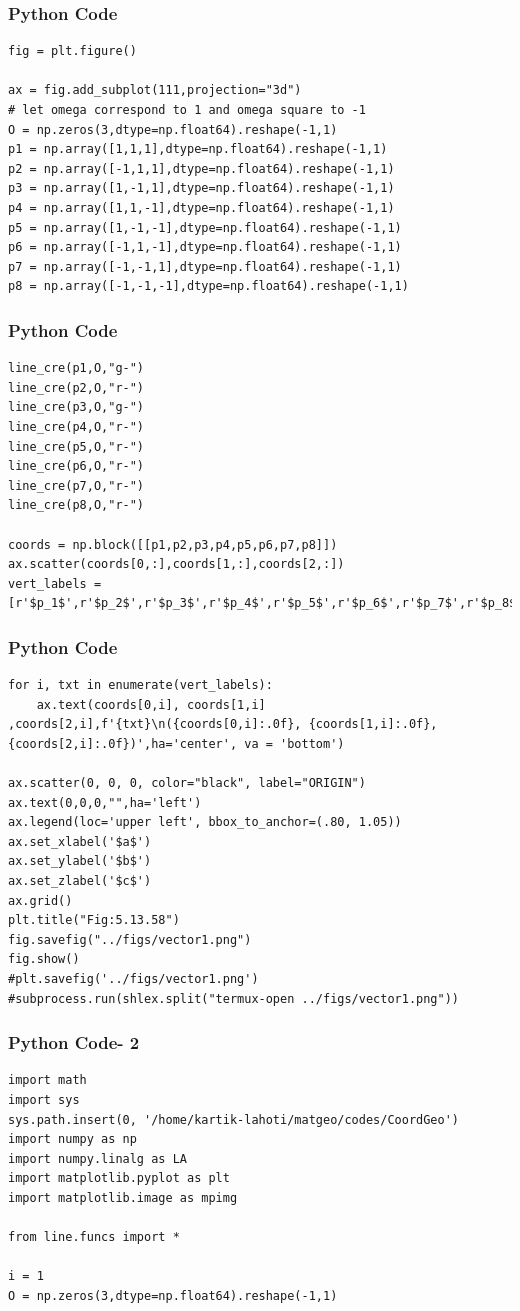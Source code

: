 \documentclass{beamer}
\begin{document}
\begin{frame}[fragile]
    \frametitle{Python Code}
    \begin{lstlisting}
fig = plt.figure()

ax = fig.add_subplot(111,projection="3d")
# let omega correspond to 1 and omega square to -1 
O = np.zeros(3,dtype=np.float64).reshape(-1,1)
p1 = np.array([1,1,1],dtype=np.float64).reshape(-1,1)
p2 = np.array([-1,1,1],dtype=np.float64).reshape(-1,1)
p3 = np.array([1,-1,1],dtype=np.float64).reshape(-1,1)
p4 = np.array([1,1,-1],dtype=np.float64).reshape(-1,1)
p5 = np.array([1,-1,-1],dtype=np.float64).reshape(-1,1)
p6 = np.array([-1,1,-1],dtype=np.float64).reshape(-1,1)
p7 = np.array([-1,-1,1],dtype=np.float64).reshape(-1,1)
p8 = np.array([-1,-1,-1],dtype=np.float64).reshape(-1,1)
\end{lstlisting}
\end{frame}
\begin{frame}[fragile]
    \frametitle{Python Code}
    \begin{lstlisting}
line_cre(p1,O,"g-")
line_cre(p2,O,"r-")
line_cre(p3,O,"g-")
line_cre(p4,O,"r-")
line_cre(p5,O,"r-")
line_cre(p6,O,"r-")
line_cre(p7,O,"r-")
line_cre(p8,O,"r-")

coords = np.block([[p1,p2,p3,p4,p5,p6,p7,p8]])
ax.scatter(coords[0,:],coords[1,:],coords[2,:])
vert_labels =[r'$p_1$',r'$p_2$',r'$p_3$',r'$p_4$',r'$p_5$',r'$p_6$',r'$p_7$',r'$p_8$']
\end{lstlisting}
\end{frame}
\begin{frame}[fragile]
    \frametitle{Python Code}
    \begin{lstlisting}
for i, txt in enumerate(vert_labels):
    ax.text(coords[0,i], coords[1,i] ,coords[2,i],f'{txt}\n({coords[0,i]:.0f}, {coords[1,i]:.0f},{coords[2,i]:.0f})',ha='center', va = 'bottom')
        
ax.scatter(0, 0, 0, color="black", label="ORIGIN")
ax.text(0,0,0,"",ha='left')
ax.legend(loc='upper left', bbox_to_anchor=(.80, 1.05))
ax.set_xlabel('$a$')
ax.set_ylabel('$b$')
ax.set_zlabel('$c$')
ax.grid()
plt.title("Fig:5.13.58")
fig.savefig("../figs/vector1.png")
fig.show()
#plt.savefig('../figs/vector1.png')
#subprocess.run(shlex.split("termux-open ../figs/vector1.png"))
\end{lstlisting}
\end{frame}

\begin{frame}[fragile]
    \frametitle{Python Code- 2 }
    \begin{lstlisting}
import math
import sys
sys.path.insert(0, '/home/kartik-lahoti/matgeo/codes/CoordGeo')
import numpy as np
import numpy.linalg as LA
import matplotlib.pyplot as plt
import matplotlib.image as mpimg

from line.funcs import *

i = 1 
O = np.zeros(3,dtype=np.float64).reshape(-1,1)
\end{lstlisting}
\end{frame}
\end{document}
